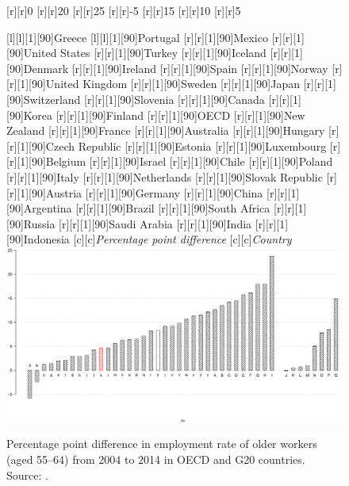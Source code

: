 \documentclass[11 pt, a4paper]{report}
\begin{document}
\begin{figure}[hbtp!]
[r][r]{\small{0}}
[r][r]{\small{20}}
[r][r]{\small{25}}
[r][r]{\small{-5}}
[r][r]{\small{15}}
[r][r]{\small{10}}
[r][r]{\small{5}}

[l][l][1][90]{\tiny{Greece}}
[l][l][1][90]{\tiny{Portugal}}
[r][r][1][90]{\tiny{Mexico}}
[r][r][1][90]{\tiny{United States}}
[r][r][1][90]{\tiny{Turkey}}
[r][r][1][90]{\tiny{Iceland}}
[r][r][1][90]{\tiny{Denmark}}
[r][r][1][90]{\tiny{Ireland}}
[r][r][1][90]{\tiny{Spain}}
[r][r][1][90]{\tiny{Norway}}
[r][r][1][90]{\tiny{\color{red}United Kingdom}}
[r][r][1][90]{\tiny{Sweden}}
[r][r][1][90]{\tiny{Japan}}
[r][r][1][90]{\tiny{Switzerland}}
[r][r][1][90]{\tiny{Slovenia}}
[r][r][1][90]{\tiny{Canada}}
[r][r][1][90]{\tiny{Korea}}
[r][r][1][90]{\tiny{Finland}}
[r][r][1][90]{\tiny{OECD}}
[r][r][1][90]{\tiny{New Zealand}}
[r][r][1][90]{\tiny{France}}
[r][r][1][90]{\tiny{Australia}}
[r][r][1][90]{\tiny{Hungary}}
[r][r][1][90]{\tiny{Czech Republic}}
[r][r][1][90]{\tiny{Estonia}}
[r][r][1][90]{\tiny{Luxembourg}}
[r][r][1][90]{\tiny{Belgium}}
[r][r][1][90]{\tiny{Israel}}
[r][r][1][90]{\tiny{Chile}}
[r][r][1][90]{\tiny{Poland}}
[r][r][1][90]{\tiny{Italy}}
[r][r][1][90]{\tiny{Netherlands}}
[r][r][1][90]{\tiny{Slovak Republic}}
[r][r][1][90]{\tiny{Austria}}
[r][r][1][90]{\tiny{Germany}}
[r][r][1][90]{\tiny{China}}
[r][r][1][90]{\tiny{Argentina}}
[r][r][1][90]{\tiny{Brazil}}
[r][r][1][90]{\tiny{South Africa}}
[r][r][1][90]{\tiny{Russia}}
[r][r][1][90]{\tiny{Saudi Arabia}}
[r][r][1][90]{\tiny{India}}
[r][r][1][90]{\tiny{Indonesia}}
[c][c]{\small{\emph{Percentage point difference}}}
[c][c]{\small{\emph{Country}}}
\includegraphics[width=\textwidth]{../figures/Fig5.6.eps}
\caption{Percentage point difference in employment rate of older workers (aged 55--64) from 2004 to 2014 in OECD and G20 countries. Source: \citet{OECD2015}.}
\label{Fig:OECD2}
\end{figure}
\end{document}
